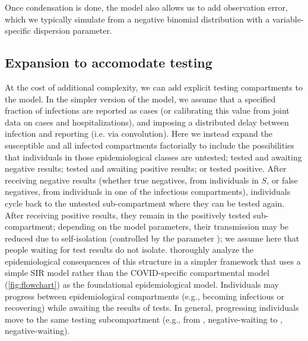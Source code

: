 \documentclass[12pt]{article}\usepackage[]{graphicx}\usepackage[]{color}
\begin{document}
Once condensation is done, the model also allows us to add observation error, which we typically simulate from a negative binomial distribution with a variable-specific dispersion parameter.

\subsection*{Expansion to accomodate testing}

At the cost of additional complexity, we can add explicit testing compartments to the model.
In the simpler version of the model, we assume that a specified fraction of infections are reported as cases (or calibrating this value from joint data on cases and hospitalizations), and imposing a distributed delay between infection and reporting (i.e. via convolution).
Here we instead expand the susceptible and all infected compartments factorially to include the possibilities that individuals in those epidemiological classes are untested; tested and awaiting negative results; tested and awaiting positive results; or tested positive.
After receiving negative results (whether true negatives, from individuals in $S$, or false negatives, from individuals in one of the infectious compartments), individuals cycle back to the untested sub-compartment where they can be tested again. After receiving positive results, they remain in the positively tested sub-compartment; depending on the model parameters, their transmission may be reduced due to self-isolation (controlled by the parameter ); we assume here that people waiting for test results do not isolate.
\cite{Ghar+22} thoroughly analyze the epidemiological consequences of this structure in a simpler framework that uses a simple SIR model rather than the COVID-specific compartmental model (\cref{fig:flowchart}) as the foundational epidemiological model.
Individuals may progress between epidemiological compartments (e.g., becoming infectious or recovering) while awaiting the results of tests. In general, progressing individuals move to the same testing subcompartment (e.g., from , negative-waiting to , negative-waiting).
\end{document}
